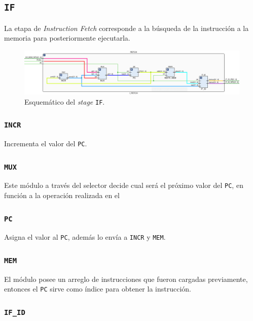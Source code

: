 \documentclass[a4paper]{article}
\begin{document}
\subsection{\texttt{IF}}
La etapa de \textit{Instruction Fetch} corresponde a la búsqueda de la instrucción a la memoria para posteriormente ejecutarla.

\begin{figure}[H]
	\begin{center}				
	\includegraphics[width=1.4\textwidth,center]{TP4_17.png}
  	\caption{Esquemático del \textit{stage} \texttt{IF}.}
  	\label{fig:funcionamiento.}
  	\end{center}
\end{figure}

\subsubsection{\texttt{INCR}}

Incrementa el valor del \texttt{PC}.

\subsubsection{\texttt{MUX}}

Este módulo a través del selector decide cual será el próximo valor del \texttt{PC}, en función a la operación realizada en el 

\subsubsection{\texttt{PC}}
Asigna el valor al \texttt{PC}, además lo envía a \texttt{INCR} y \texttt{MEM}.

\subsubsection{\texttt{MEM}}

El módulo posee un arreglo de instrucciones que fueron cargadas previamente, entonces el \texttt{PC} sirve como índice para obtener la instrucción.

\subsubsection{\texttt{IF\_ID}}
\end{document}

